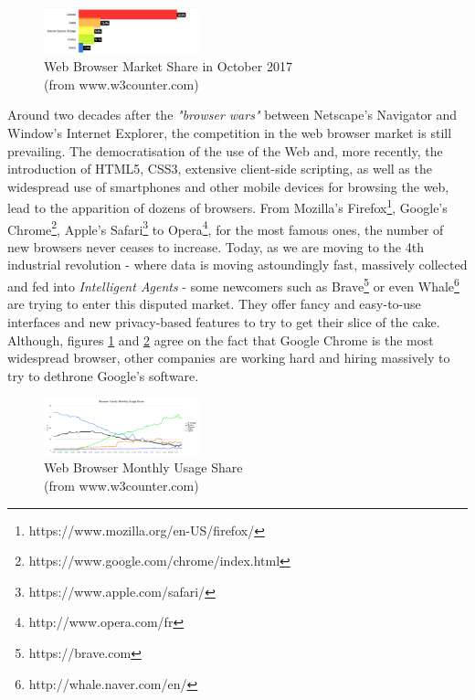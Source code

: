 \documentclass[journal]{IEEEtran}
\begin{document}
\begin{figure}[h]
\includegraphics[width=0.4\textwidth]{images/WebBrowserMarketShare.png}
\caption{Web Browser Market Share in October 2017 \\ (from www.w3counter.com)}
\label{fig:marketShare}
\end{figure}

Around two decades after the \emph{"browser wars"} between Netscape's Navigator and Window's Internet Explorer, the competition in the web browser market is still prevailing. The democratisation of the use of the Web and, more recently, the introduction of HTML5, CSS3, extensive client-side scripting, as well as the widespread use of smartphones and other mobile devices for browsing the web, lead to the apparition of dozens of browsers. From Mozilla's Firefox\footnote{https://www.mozilla.org/en-US/firefox/}, Google's Chrome\footnote{https://www.google.com/chrome/index.html}, Apple's Safari\footnote{https://www.apple.com/safari/} to Opera\footnote{http://www.opera.com/fr}, for the most famous ones, the number of new browsers never ceases to increase. Today, as we are moving to the 4th industrial revolution - where data is moving astoundingly fast, massively collected and fed into \emph{Intelligent Agents} - some newcomers such as Brave\footnote{https://brave.com} or even Whale\footnote{http://whale.naver.com/en/} are trying to enter this disputed market. They offer fancy and easy-to-use interfaces and new privacy-based features to try to get their slice of the cake.
Although, figures \ref{fig:marketShare} and \ref{fig:monthlyUsage} agree on the fact that Google Chrome is the most widespread browser, other companies are working hard and hiring massively to try to dethrone Google's software.

\begin{figure}[h]
\centering
\includegraphics[width=0.4\textwidth]{images/BrowserFamilyMonthlyUsageShare.png}
\caption{Web Browser Monthly Usage Share \\ (from www.w3counter.com)}
\label{fig:monthlyUsage}
\end{figure}
\end{document}
